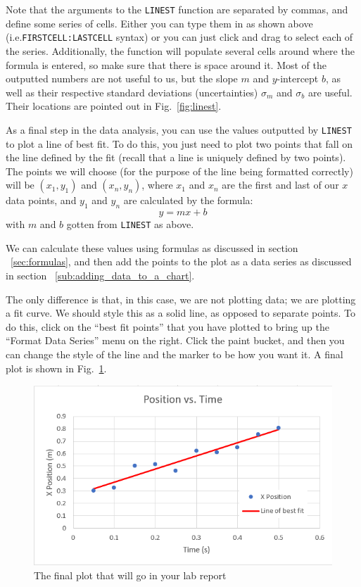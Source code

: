 \documentclass[10pt]{article}
\begin{document}
Note that the arguments to the \texttt{LINEST} function are separated by commas, and define some series of cells.
Either you can type them in as shown above (i.e.\texttt{FIRSTCELL:LASTCELL} syntax) or you can just click and drag to select each of the series.
Additionally, the function will populate several cells around where the formula is entered, so make sure that there is space around it.
Most of the outputted numbers are not useful to us, but the slope $m$ and $y$-intercept $b$, as well as their respective standard deviations (uncertainties) $\sigma_m$ and $\sigma_b$ are useful.
Their locations are pointed out in Fig.~\ref{fig:linest}.

As a final step in the data analysis, you can use the values outputted by \texttt{LINEST} to plot a line of best fit.
To do this, you just need to plot two points that fall on the line defined by the fit (recall that a line is uniquely defined by two points).
The points we will choose (for the purpose of the line being formatted correctly) will be $(x_1, y_1)$ and $(x_n, y_n)$, where $x_1$ and $x_n$ are the first and last of our $x$ data points, and $y_1$ and $y_n$ are calculated by the formula:
\[
y = mx + b
\]
with $m$ and $b$ gotten from \texttt{LINEST} as above.

We can calculate these values using formulas as discussed in section ~\ref{sec:formulas}, and then add the points to the plot as a data series as discussed in section ~\ref{sub:adding_data_to_a_chart}.

The only difference is that, in this case, we are not plotting data; we are plotting a fit curve.
We should style this as a solid line, as opposed to separate points.
To do this, click on the ``best fit points'' that you have plotted to bring up the ``Format Data Series'' menu on the right.
Click the paint bucket, and then you can change the style of the line and the marker to be how you want it.
A final plot is shown in Fig.~\ref{fig:images_finished-plot}.

\begin{figure}[htpb]
	\centering
	\includegraphics[width=0.8\linewidth]{images/finished-plot.png}
	\caption{The final plot that will go in your lab report}%
	\label{fig:images_finished-plot}
\end{figure}
\end{document}
